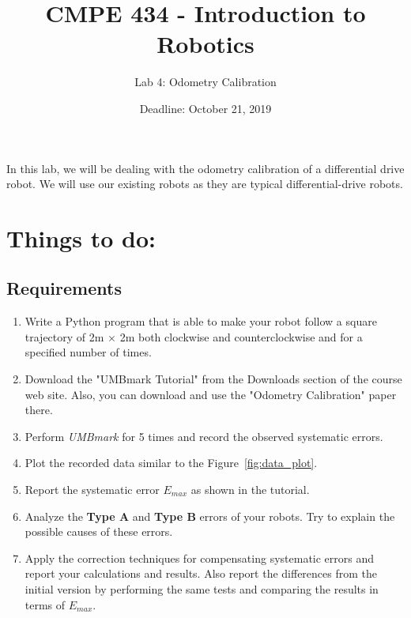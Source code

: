\documentclass{scrartcl}
\title{CMPE 434 - Introduction to Robotics}
\subtitle{Lab 4: Odometry Calibration}
\date{Deadline: October 21, 2019}
\begin{document}
\maketitle

In this lab, we will be dealing with the odometry calibration of a differential drive robot. We will use our existing robots as they are typical differential-drive robots.

\section{Things to do:}
\subsection{Requirements}

 \begin{enumerate}
\def\labelenumi{\arabic{enumi}.}
\item
  Write a Python program that is able to make your robot follow a square
  trajectory of 2m $\times$ 2m both clockwise and counterclockwise and for a
  specified number of times.
  \item Download the "UMBmark Tutorial" from the Downloads section of the course web site. Also, you can download and use the "Odometry Calibration" paper there.
\item
  Perform \textit{UMBmark} for 5 times and record the observed
  systematic errors.
\item Plot the recorded data similar to the Figure~\ref{fig:data_plot}.
  \item Report the systematic error $E_{max}$ as shown in the tutorial.
\item
  Analyze the \textbf{Type A} and \textbf{Type B} errors of your robots. Try to explain the possible causes of these errors.
\item
  Apply the correction techniques for compensating systematic errors and report your calculations and results.
  Also report the differences from the initial version by performing the same tests and comparing the results in terms of $E_{max}$.
\end{enumerate}
\end{document}
